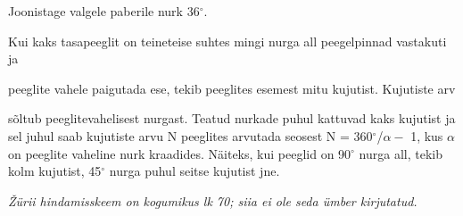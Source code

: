 
Joonistage valgele paberile nurk 36$^\circ$.

\hint

\solu
Kui kaks tasapeeglit on teineteise suhtes mingi nurga all peegelpinnad vastakuti ja

peeglite vahele paigutada ese, tekib peeglites esemest mitu kujutist. Kujutiste arv

sõltub peeglitevahelisest nurgast. Teatud nurkade puhul kattuvad kaks kujutist ja sel juhul saab kujutiste arvu N peeglites arvutada seosest N = 360$^\circ$/$\alpha -$ 1, kus $\alpha$ on peeglite vaheline nurk kraadides. Näiteks, kui peeglid on 90$^\circ$ nurga all, tekib kolm kujutist, 45$^\circ$ nurga puhul seitse kujutist jne.

\textit{Žürii hindamisskeem on kogumikus lk 70; siia ei ole seda ümber kirjutatud.}
\probend

